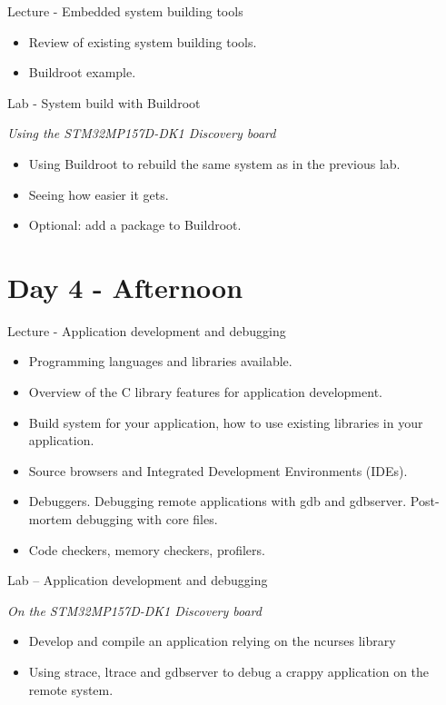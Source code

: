 \documentclass[a4paper,12pt,obeyspaces,spaces,hyphens]{article}
\begin{document}
\feagendatwocolumn
{Lecture - Embedded system building tools}
{
  \begin{itemize}
  \item Review of existing system building tools.
  \item Buildroot example.
  \end{itemize}
}
{Lab - System build with Buildroot}
{
  {\em Using the STM32MP157D-DK1 Discovery board}
  \begin{itemize}
  \item Using Buildroot to rebuild the same system as in the previous lab.
  \item Seeing how easier it gets.
  \item Optional: add a package to Buildroot.
  \end{itemize}
}

\section{Day 4 - Afternoon}

\feagendaonecolumn
{Lecture - Application development and debugging}
{
  \begin{itemize}
  \item Programming languages and libraries available.
  \item Overview of the C library features for application development.
  \item Build system for your application,
        how to use existing libraries in your application.
  \item Source browsers and Integrated Development Environments (IDEs).
  \item Debuggers. Debugging remote applications with gdb and gdbserver.
        Post-mortem debugging with core files.
  \item Code checkers, memory checkers, profilers.
  \end{itemize}
}

\feagendaonecolumn
{Lab – Application development and debugging}
{
  {\em On the STM32MP157D-DK1 Discovery board}
  \begin{itemize}
  \item Develop and compile an application relying on the ncurses library
  \item Using strace, ltrace and gdbserver to debug a crappy application
        on the remote system.
  \end{itemize}
}
\end{document}
